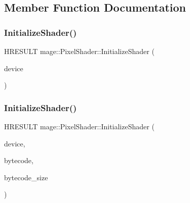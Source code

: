 \subsection{Member Function Documentation}
\hypertarget{classmage_1_1_pixel_shader_aa4720c76ee456bc136fa4e58de1a03a4}{}\label{classmage_1_1_pixel_shader_aa4720c76ee456bc136fa4e58de1a03a4} 
\subsubsection{\texorpdfstring{Initialize\+Shader()}{InitializeShader()}\hspace{0.1cm}{\footnotesize\ttfamily [1/2]}}
{\footnotesize\ttfamily H\+R\+E\+S\+U\+LT mage\+::\+Pixel\+Shader\+::\+Initialize\+Shader (\begin{DoxyParamCaption}\item[{\hyperlink{namespacemage_ae74f374780900893caa5555d1031fd79}{Com\+Ptr}$<$ I\+D3\+D11\+Device2 $>$}]{device }\end{DoxyParamCaption})\hspace{0.3cm}{\ttfamily [private]}}

\hypertarget{classmage_1_1_pixel_shader_ae9194154f0cb7948ef7d85991f2aa227}{}\label{classmage_1_1_pixel_shader_ae9194154f0cb7948ef7d85991f2aa227} 
\subsubsection{\texorpdfstring{Initialize\+Shader()}{InitializeShader()}\hspace{0.1cm}{\footnotesize\ttfamily [2/2]}}
{\footnotesize\ttfamily H\+R\+E\+S\+U\+LT mage\+::\+Pixel\+Shader\+::\+Initialize\+Shader (\begin{DoxyParamCaption}\item[{\hyperlink{namespacemage_ae74f374780900893caa5555d1031fd79}{Com\+Ptr}$<$ I\+D3\+D11\+Device2 $>$}]{device,  }\item[{const void $\ast$}]{bytecode,  }\item[{S\+I\+Z\+E\+\_\+T}]{bytecode\+\_\+size }\end{DoxyParamCaption})\hspace{0.3cm}{\ttfamily [private]}}


